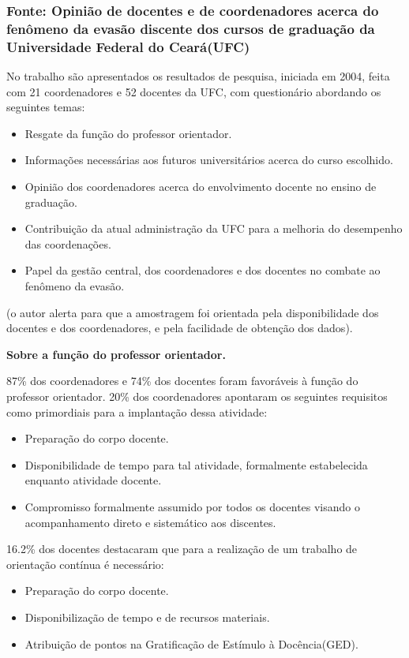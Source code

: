 \documentclass{report}
\begin{document}
\subsubsection{Fonte: Opinião de docentes e de coordenadores acerca do fenômeno da evasão discente dos cursos de graduação da Universidade Federal do Ceará(UFC)}

No trabalho \cite{andriola} são apresentados os resultados de pesquisa, iniciada em 2004, feita com 21 coordenadores e 52 docentes da UFC, com questionário abordando os seguintes temas:
\begin{itemize}
\item Resgate da função do professor orientador.
\item Informações necessárias aos futuros universitários acerca do curso escolhido.
\item Opinião dos coordenadores acerca do envolvimento docente no ensino de graduação.
\item Contribuição da atual administração da UFC para a melhoria do desempenho das coordenações.
\item Papel da gestão central, dos coordenadores e dos docentes no combate ao fenômeno da evasão.
\end{itemize}
(o autor alerta para que a amostragem foi orientada pela disponibilidade dos docentes e dos coordenadores, e pela facilidade de obtenção dos dados).

\textbf{Sobre a função do professor orientador.}

87\% dos coordenadores e 74\% dos docentes foram favoráveis à função do professor orientador. 20\% dos coordenadores apontaram os seguintes requisitos como primordiais para a implantação dessa atividade:

\begin{itemize}
\item Preparação do corpo docente.
\item Disponibilidade de tempo para tal atividade, formalmente estabelecida enquanto atividade docente.
\item Compromisso formalmente assumido por todos os docentes visando o acompanhamento direto e sistemático aos discentes.
\end{itemize}

16.2\% dos docentes destacaram que para a realização de um trabalho de orientação contínua é necessário:

\begin{itemize}
\item Preparação do corpo docente.
\item Disponibilização de tempo e de recursos materiais.
\item Atribuição de pontos na Gratificação de Estímulo à Docência(GED).
\end{itemize}
\end{document}
